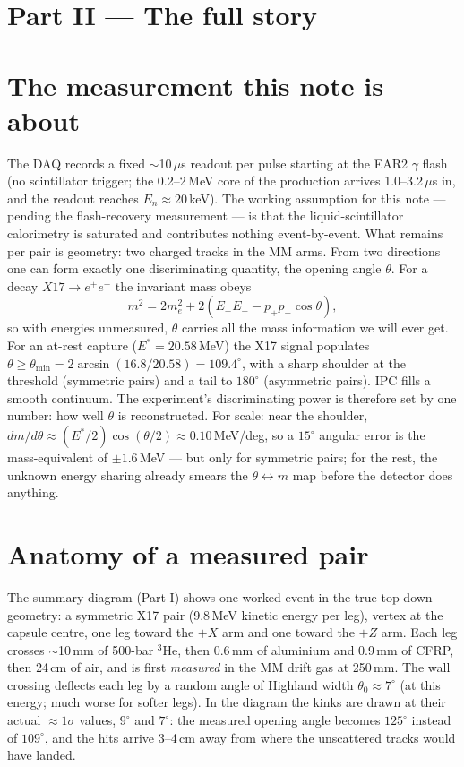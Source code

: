 \documentclass[11pt,a4paper]{article}
\newcommand{\He}[1]{$^{#1}$He}
\begin{document}
\clearpage
\section*{Part II --- The full story}

\section{The measurement this note is about}

The DAQ records a fixed $\sim$10\,$\mu$s readout per pulse starting at the
EAR2 $\gamma$ flash (no scintillator trigger; the 0.2--2\,MeV core of the
production arrives 1.0--3.2\,$\mu$s in, and the readout reaches
$E_n \approx 20$\,keV). The working assumption for this note --- pending the
flash-recovery measurement --- is that the liquid-scintillator calorimetry is
saturated and contributes nothing event-by-event. What remains per pair is
geometry: two charged tracks in the MM arms. From two directions one can form
exactly one discriminating quantity, the opening angle $\theta$. For a decay
$X17\to e^+e^-$ the invariant mass obeys
\begin{equation}
m^2 = 2m_e^2 + 2\left(E_+E_- - p_+p_-\cos\theta\right),
\end{equation}
so with energies unmeasured, $\theta$ carries all the mass information we
will ever get. For an at-rest capture ($E^{*}=20.58$\,MeV) the X17 signal
populates $\theta \ge \theta_{\min} = 2\arcsin(16.8/20.58) = 109.4^{\circ}$,
with a sharp shoulder at the threshold (symmetric pairs) and a tail to
$180^{\circ}$ (asymmetric pairs). IPC fills a smooth continuum. The
experiment's discriminating power is therefore set by one number: how well
$\theta$ is reconstructed. For scale: near the shoulder,
$dm/d\theta \approx (E^{*}/2)\cos(\theta/2) \approx 0.10$\,MeV/deg, so a
$15^{\circ}$ angular error is the mass-equivalent of $\pm1.6$\,MeV --- but
only for symmetric pairs; for the rest, the unknown energy sharing already
smears the $\theta\leftrightarrow m$ map before the detector does anything.

\section{Anatomy of a measured pair}

The summary diagram (Part I) shows one worked event in the true top-down
geometry: a symmetric X17 pair (9.8\,MeV kinetic energy per leg), vertex at
the capsule centre, one leg toward the $+X$ arm and one toward the $+Z$ arm.
Each leg crosses $\sim$10\,mm of 500-bar \He{3}, then 0.6\,mm of aluminium
and 0.9\,mm of CFRP, then 24\,cm of air, and is first \emph{measured} in the
MM drift gas at 250\,mm. The wall crossing deflects each leg by a random
angle of Highland width $\theta_0 \approx 7^{\circ}$ (at this energy; much
worse for softer legs). In the diagram the kinks are drawn at their actual
$\approx\!1\sigma$ values, $9^{\circ}$ and $7^{\circ}$: the measured opening
angle becomes $125^{\circ}$ instead of $109^{\circ}$, and the hits arrive
3--4\,cm away from where the unscattered tracks would have landed.
\end{document}

